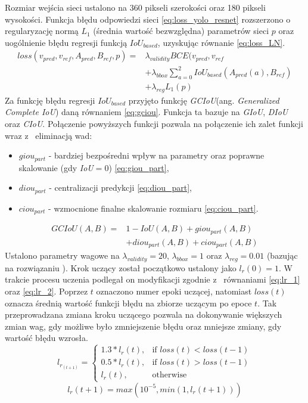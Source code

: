Rozmiar wejścia sieci ustalono na 360 pikseli szerokości oraz 180 pikseli wysokości.
Funkcja błędu odpowiedzi sieci \eqref{eq:loss_yolo_resnet} rozszerzono o~ regularyzację normą $L_1$ (średnia wartość bezwzględna) parametrów sieci $p$ oraz uogólnienie błędu regresji funkcją $IoU_{based}$, uzyskując równanie \eqref{eq:loss_LN}.
\begin{equation}
\begin{aligned}
loss(v_{pred},v_{ref},A_{pred}, B_{ref}, p) 
=& \lambda_{validity} BCE(v_{pred}, v_{ref} \\
&+ \lambda_{bbox} \sum_{a = 0}^{2} IoU_{based}(A_{pred}(a), B_{ref}) \\
&+ \lambda_{reg} L_1(p)
\end{aligned}
\label{eq:loss_LN}
\end{equation}
Za funkcję błędu regresji $IoU_{based}$ przyjęto funkcję \emph{GCIoU}(ang. \emph{Generalized Complete IoU}) daną równaniem \eqref{eq:gciou}. 
Funkcja ta bazuje na \emph{GIoU}\cite{giou}, \emph{DIoU}\cite{dciou} oraz \emph{CIoU}\cite{dciou}. 
Połączenie powyższych funkcji pozwala na połączenie ich zalet funkcji wraz z~ eliminacją wad: 
\begin{itemize}
    \item $giou_{part}$ - bardziej bezpośredni wpływ na parametry oraz poprawne skalowanie (gdy \emph{IoU}$ = 0$) \eqref{eq:giou_part},
    \item $diou_{part}$ - centralizacji predykcji \eqref{eq:diou_part},
    \item $ciou_{part}$ - wzmocnione finalne skalowanie rozmiaru \eqref{eq:ciou_part}. 
\end{itemize}
\begin{equation}
\begin{aligned}
GCIoU(A,B) =& 1 - IoU(A,B) + giou_{part}(A,B)\\ 
&+ diou_{part}(A,B) + ciou_{part}(A,B)
\end{aligned}
\label{eq:gciou}
\end{equation}
Ustalono parametry wagowe na $\lambda_{validity} = 20$, $\lambda_{bbox} = 1$ oraz $\lambda_{reg} = 0.01$ (bazując na rozwiązaniu \cite{ultra_net}).
Krok uczący został początkowo ustalony jako $l_r(0)=1$. 
W trakcie procesu uczenia podlegał on modyfikacji zgodnie z~ równaniami \eqref{eq:lr_1} oraz \eqref{eq:lr_2}.
Poprzez $t$ oznaczono numer epoki uczącej, natomiast $loss(t)$ oznacza średnią wartość funkcji błędu na zbiorze uczącym po epoce $t$.
Tak przeprowadzana zmiana kroku uczącego pozwala na dokonywanie większych zmian wag, gdy możliwe było zmniejszenie błędu oraz mniejsze zmiany, gdy wartość błędu wzrosła.
\begin{equation}
l_r_(t+1) = 
\begin{cases}
    1.3*l_r(t), &\text{if } loss(t) < loss(t-1) \\
    0.5*l_r(t), &\text{if } loss(t) > loss(t-1) \\
    l_r(t), &\text{otherwise}
\end{cases}
\label{eq:lr_1}
\end{equation}
\begin{equation}
l_r(t+1) = max(10^{-5}, min(1, l_r(t+1)))
\label{eq:lr_2}
\end{equation}


